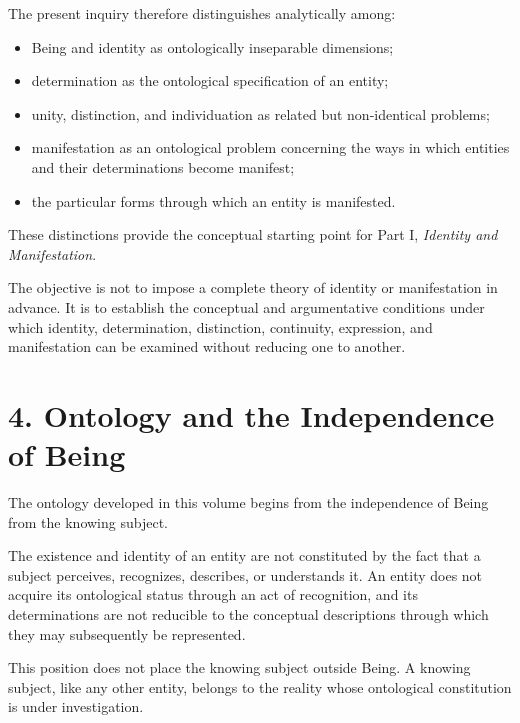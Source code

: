 The present inquiry therefore distinguishes
analytically among:

\begin{itemize}
    \item Being and identity as ontologically
    inseparable dimensions;
    \item determination as the ontological
    specification of an entity;
    \item unity, distinction, and individuation
    as related but non-identical problems;
    \item manifestation as an ontological problem
    concerning the ways in which entities and
    their determinations become manifest;
    \item the particular forms through which
    an entity is manifested.
\end{itemize}

These distinctions provide the conceptual
starting point for Part I, \textit{Identity and
Manifestation}.

The objective is not to impose a complete
theory of identity or manifestation in advance.
It is to establish the conceptual and argumentative
conditions under which identity, determination,
distinction, continuity, expression, and manifestation
can be examined without reducing one to another.


\section*{4. Ontology and the Independence of Being}

The ontology developed in this volume begins
from the independence of Being from the knowing
subject.

The existence and identity of an entity are not
constituted by the fact that a subject perceives,
recognizes, describes, or understands it. An entity
does not acquire its ontological status through
an act of recognition, and its determinations
are not reducible to the conceptual descriptions
through which they may subsequently be represented.

This position does not place the knowing subject
outside Being. A knowing subject, like any other
entity, belongs to the reality whose ontological
constitution is under investigation.

